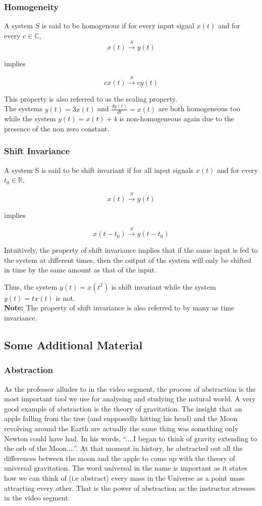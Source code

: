 \subsubsection{Homogeneity}
A system $S$ is said to be homogenous if for every input signal $x(t)$ and for every $c \in \mathbb{C}$,
\[
x(t) \xrightarrow{S} y(t)
\]
\begin{center}
implies
\end{center}
\[
cx(t) \xrightarrow{S} cy(t)
\]

This property is also referred to as the scaling property.\\

The systems $y(t) = 3x(t)$ and $\frac{dy(t)}{dt} = x(t)$ are both homogeneous too while the system $y(t) = x(t) + 4$ is non-homogeneous again due to the presence of the non zero constant.

\subsubsection{Shift Invariance}
A system S is said to be shift invariant if for all input signals $x(t)$ and for every $t_{0} \in \mathbb{R}$,

\[
x(t) \xrightarrow{S} y(t)
\]
\begin{center}
implies
\end{center}
\[
x(t - t_{0}) \xrightarrow{S} y(t - t_{0})
\]

Intuitively, the property of shift invariance implies that if the same input is fed to the system at different times, then the output of the system will only be shifted in time by the same amount 
as that of the input.

Thus, the system $y(t) = x(t^{2})$ is shift invariant while the system $y(t) = tx(t)$ is not.\\
\textbf{Note:} The property of shift invariance is also referred to by many as time invariance.

\subsection*{Some Additional Material}
\subsubsection{Abstraction}
As the professor alludes to in the video segment, the process of abstraction is the most important tool we use for analysing and studying the natural world. A very good example of abstraction is the theory of gravitation. The insight that an apple falling from the tree (and supposedly hitting his head) and the Moon revolving around the Earth are actually the same thing was something only Newton could have had. In his words, ``....I began to think of gravity extending to the orb of the Moon....''. At that moment in history, he abstracted out all the differences between the moon and the apple to come up with the theory of universal gravitation. The word universal in the name is important as it states how we can think of (i.e abstract) every mass in the Universe as a point mass attracting every other. That is the power of abstraction as the instructor stresses in the video segment.

